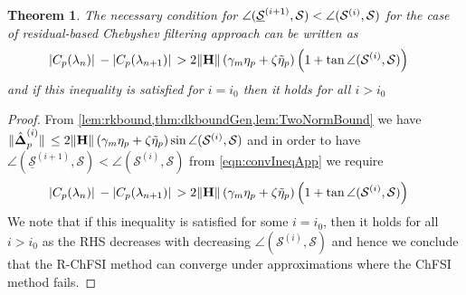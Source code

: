 \documentclass[preprint,3p,number,sort&compress]{elsarticle}
\newtheorem{theorem}{Theorem}[section]
\newcommand{\bH}{\textbf{H}}
\newcommand{\bDelta}{\boldsymbol{\Delta}}
\DeclarePairedDelimiter\norm{\lVert}{\rVert\,}%
\DeclarePairedDelimiter\abs{\lvert}{\rvert\,}%
\begin{document}
\begin{theorem}
The necessary condition for $\normalfont\angle(\underline{\mathcal{S}}^{(i+1)},\mathcal{S})<\angle(\mathcal{S}^{(i)},\mathcal{S})$ for the case of residual-based Chebyshev filtering approach can be written as
\begin{align}
 \normalfont\abs{C_p(\lambda_n)}-\abs{C_p(\lambda_{n+1})}&\normalfont >2\norm{\bH}(\gamma_m\eta_p+\zeta\tilde{\eta}_p)\left(1+\tan{\angle(\mathcal{S}^{(i)},\mathcal{S})}\right)
\end{align}
and if this inequality is satisfied for $i=i_0$ then it holds for all $i>i_0$
\end{theorem}
\begin{proof}
From \cref{lem:rkbound,thm:dkboundGen,lem:TwoNormBound} we have $\norm{\hat{\bDelta}_p^{(i)}}\leq2\norm{\bH}(\gamma_m\eta_p+\zeta\tilde{\eta}_p)\sin{\angle(\mathcal{S}^{(i)},\mathcal{S})}$ and in order to have $\angle(\underline{\mathcal{S}}^{(i+1)},\mathcal{S})<\angle(\mathcal{S}^{(i)},\mathcal{S})$ from \cref{eqn:convIneqApp} we require
\begin{align}
 \abs{C_p(\lambda_n)}-\abs{C_p(\lambda_{n+1})}&>2\norm{\bH}(\gamma_m\eta_p+\zeta\tilde{\eta}_p)\left(1+\tan{\angle(\mathcal{S}^{(i)},\mathcal{S})}\right)
\end{align}
We note that if this inequality is satisfied for some $i=i_0$, then it holds for all $i>i_0$ as the RHS decreases with decreasing $\angle(\mathcal{S}^{(i)},\mathcal{S})$ and hence we conclude that the R-ChFSI method can converge under approximations where the ChFSI method fails.
\end{proof}
\end{document}
